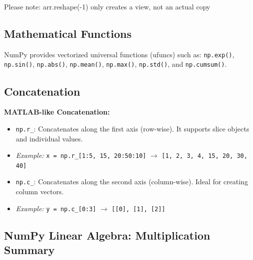 Please note: arr.reshape(-1) only creates a view, not an actual copy


\subsection{Mathematical Functions}
NumPy provides vectorized universal functions (ufuncs) such as: \texttt{np.exp()}, \texttt{np.sin()}, \texttt{np.abs()}, \texttt{np.mean()}, \texttt{np.max()}, \texttt{np.std()}, and \texttt{np.cumsum()}.

\subsection{Concatenation}
\textbf{MATLAB-like Concatenation:}

\begin{itemize}
    \item \texttt{np.r\_}: Concatenates along the first axis (row-wise). It supports slice objects and individual values.
    \item \textit{Example:} \texttt{x = np.r\_[1:5, 15, 20:50:10]} $\rightarrow$ \texttt{[1, 2, 3, 4, 15, 20, 30, 40]}
    \item \texttt{np.c\_}: Concatenates along the second axis (column-wise). Ideal for creating column vectors.
    \item \textit{Example:} \texttt{y = np.c\_[0:3]} $\rightarrow$ \texttt{[[0], [1], [2]]}
\end{itemize}

\subsection{NumPy Linear Algebra: Multiplication Summary}

